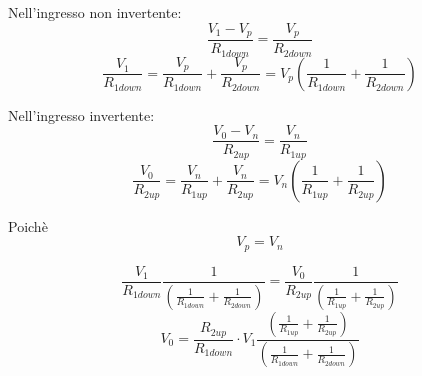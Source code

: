 Nell'ingresso non invertente:
$$\frac{V_1-V_p}{R_{1down}}=\frac{V_p}{R_{2down}}$$
$$\frac{V_1}{R_{1down}}=\frac{V_p}{R_{1down}}+\frac{V_p}{R_{2down}}=V_p \left(\frac{1}{R_{1down}}+\frac{1}{R_{2down}}\right)$$

Nell'ingresso invertente:
$$\frac{V_0-V_n}{R_{2up}}=\frac{V_n}{R_{1up}}$$
$$\frac{V_0}{R_{2up}}=\frac{V_n}{R_{1up}}+\frac{V_n}{R_{2up}}=V_n \left(\frac{1}{R_{1up}}+\frac{1}{R_{2up}}\right)$$

Poichè 
$$V_p=V_n$$

$$\frac{V_1}{R_{1down}} \frac{1}{\left(\frac{1}{R_{1down}}+\frac{1}{R_{2down} }\right)}=\frac{V_0}{R_{2up}} \frac{1}{\left(\frac{1}{R_{1up}}+\frac{1}{R_{2up}} \right)}$$
$$V_0=\frac{R_{2up}}{R_{1down}} \cdot V_1 \frac{\left(\frac{1}{R_{1up}}+\frac{1}{R_{2up} }\right)}{\left(\frac{1}{R_{1down}}+\frac{1}{R_{2down}} \right)}$$
